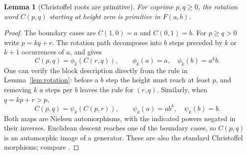 \documentclass[11pt,letterpaper]{article}
\newtheorem{lemma}[theorem]{Lemma}
\theoremstyle{definition}
\begin{document}
\begin{lemma}[Christoffel roots are primitive]
\label{lem:primitiveC}
For coprime $p,q\geq0$, the rotation word $C(p,q)$ starting at height zero
is primitive in $F(a,b)$.
\end{lemma}
\begin{proof}
The boundary cases are $C(1,0)=a$ and $C(0,1)=b$. For $p\geq q>0$ write
$p=kq+r$. The rotation path decomposes into $b$ steps preceded by $k$ or
$k+1$ occurrences of $a$, and gives
\begin{equation}
 C(p,q)=\phi_k(C(r,q)),\qquad
 \phi_k(a)=a,\quad \phi_k(b)=a^k b.
 \label{eq:euclid1}
\end{equation}
One can verify the block description directly from the rule in
Lemma~\ref{lem:rotation}: before a $b$ step the height must reach at least
$p$, and removing $k$ $a$ steps per $b$ leaves the rule for $(r,q)$.
Similarly, when $q=kp+r>p$,
\begin{equation}
 C(p,q)=\psi_k(C(p,r)),\qquad
 \psi_k(a)=ab^k,\quad \psi_k(b)=b.
 \label{eq:euclid2}
\end{equation}
Both maps are Nielsen automorphisms, with the indicated powers negated in
their inverses. Euclidean descent reaches one of the boundary cases, so
$C(p,q)$ is an automorphic image of a generator. These are also the standard
Christoffel morphisms; compare \cite[Section~3]{KR}.
\end{proof}
\end{document}
